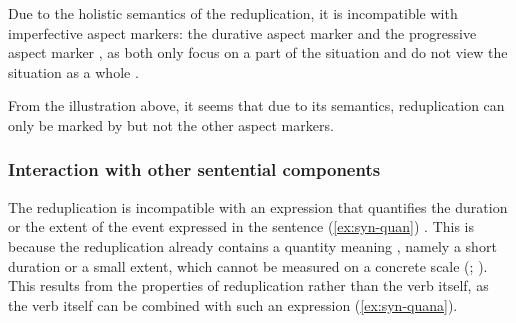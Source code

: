 Due to the holistic semantics of the reduplication, it is incompatible with imperfective aspect markers: the durative aspect marker  and the progressive aspect marker , as both only focus on  a part of the situation and do not view the situation as a whole \citep[Ch. 5]{XiaoMcEnery2004}.

From the illustration above, it seems that due to its semantics, reduplication can only be marked by  but not the other aspect markers.




\subsubsection{Interaction with other sentential components}\label{sec:adjuncts}

The reduplication is incompatible with an expression that quantifies the duration or the extent of the event expressed in the sentence (\ref{ex:syn-quan}) \citetext{ \citealp[83--84]{Li1998}; \citealp[114--115]{Chen2005}}.
This is  because the reduplication already contains a quantity meaning \citetext{\citealp[84]{Li1998}; \citealp[114--115]{Chen2005}}, namely a short duration or a small extent,
which cannot be measured on a concrete scale (\citealt[155]{XiaoMcEnery2004}; \citealt[333]{SuiHu2016}).
This results from the properties of reduplication rather than the verb itself,
as the verb itself can be combined with such an expression (\ref{ex:syn-quana}).

\ea %
\label{ex:syn-quan}
\z
\z

